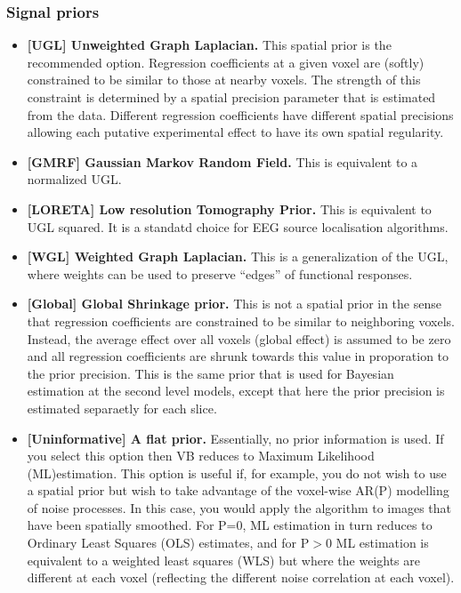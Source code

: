 \subsubsection{Signal priors}
\begin{itemize}
\item \textbf{[UGL] Unweighted Graph Laplacian.} This spatial prior is the recommended option. Regression coefficients at a given voxel are (softly) constrained to be similar to those at nearby voxels. The strength of this constraint is determined by a spatial precision parameter that is estimated from the data. Different regression coefficients have different spatial precisions allowing each putative experimental effect to have its own spatial regularity. 

\item \textbf{[GMRF] Gaussian Markov Random Field.} This is equivalent to a normalized UGL.

\item \textbf{[LORETA] Low resolution Tomography Prior.} This is equivalent to UGL squared. It is a standatd choice for EEG source localisation algorithms.

\item \textbf{[WGL] Weighted Graph Laplacian.} This is a generalization of the UGL, where weights can be used to preserve ``edges'' of functional responses.

\item \textbf{[Global] Global Shrinkage prior.} This is not a spatial prior in the sense that regression coefficients are constrained to be similar to neighboring voxels. Instead, the average effect over all voxels (global effect) is assumed to be zero and all regression coefficients are shrunk towards this value in proporation to the prior precision. This is the same prior that is used for Bayesian estimation at the second level models, except that here the prior precision is estimated separaetly for each slice.

\item \textbf{[Uninformative] A flat prior.} Essentially, no prior information is used. If you select this option then VB reduces to Maximum Likelihood (ML)estimation. This option is useful if, for example, you do not wish to use a spatial prior but wish to take advantage of the voxel-wise AR(P) modelling of noise processes. In this case, you would apply the algorithm to images that have been spatially smoothed. For P=0, ML estimation in turn reduces to Ordinary Least Squares (OLS) estimates, and for P$>$0 ML estimation is equivalent to a weighted least squares (WLS) but where the weights are different at each voxel (reflecting the different noise correlation at each voxel).
\end{itemize}

